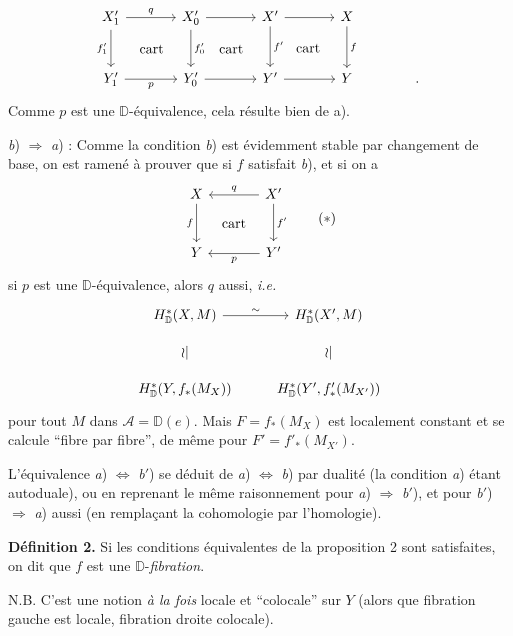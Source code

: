 \documentclass[11pt,leqno]{article}
\newcommand{\printedpage}[1]{\marginpar{\footnotesize p.~#1}}
\newcommand{\msp}[1]{\marginpar{\footnotesize [#1]}}
\newcommand{\DD}{\mathbb{D}}
\begin{document}
\msp{page 80}

\[
\begin{tikzcd}[column sep=large, row sep=large]
X'_1 \arrow[r, "q"] \arrow[d, "f'_1"'] \arrow[dr, phantom, "\text{cart}"] & X'_0 \arrow[r] \arrow[d, "f'_0"] \arrow[dr, phantom, "\text{cart}"] & X' \arrow[r] \arrow[d, "f'"] \arrow[dr, phantom, "\text{cart}"] & X \arrow[d, "f"] \\
Y'_1 \arrow[r, "p"'] & Y'_0 \arrow[r] & Y' \arrow[r] & Y & .
\end{tikzcd}
\]
Comme $p$ est une $\DD$-équivalence, cela résulte bien de a).

\indent\textit{b}) $\Rightarrow$ \textit{a}) : Comme la condition \textit{b}) est évidemment stable par changement de base, on est ramené à prouver que si $f$ satisfait \textit{b}), et si on a
\[
\begin{tikzcd}[column sep=large, row sep=large]
X \arrow[d, "f"'] \arrow[dr, phantom, "\text{cart}"] & X' \arrow[l, "q"'] \arrow[d, "f'"] \\
Y & Y' \arrow[l, "p"]
\end{tikzcd}
\tag*{$(*)$}
\]
si $p$ est une $\DD$-équivalence, alors $q$ aussi, \textit{i.e.}
\[
\begin{tikzcd}[row sep=small]
H^*_{\DD}(X,M) \arrow[r, "\sim"] & H^*_{\DD}(X',M) \\
\wr| & \wr| \\
H^*_{\DD}(Y, f_*(M_X)) & H^*_{\DD}(Y', f'_*(M_{X'}))
\end{tikzcd}
\]
pour tout $M$ dans $\mathcal{A} = \DD(e)$. Mais $F = f_*(M_X)$ est localement constant et se calcule “fibre par fibre”, de même pour $F' = f'_*(M_{X'})$.

\msp{page 81}

L'équivalence \textit{a}) $\Leftrightarrow$ \textit{b}$'$) se déduit de \textit{a}) $\Leftrightarrow$ \textit{b}) par dualité (la condition \textit{a}) étant autoduale), ou en reprenant le même raisonnement pour \textit{a}) $\Rightarrow$ \textit{b}$'$), et pour \textit{b}$'$) $\Rightarrow$ \textit{a}) aussi (en remplaçant la cohomologie par l'homologie).

\textbf{Définition 2.} Si les conditions équivalentes de la proposition 2 sont satisfaites, on dit que $f$ est une $\DD$-\textit{fibration}.

N.B. C'est une notion \textit{à la fois} locale et “colocale” sur $Y$ (alors que fibration gauche est locale, fibration droite colocale).

\printedpage{50}
\end{document}
